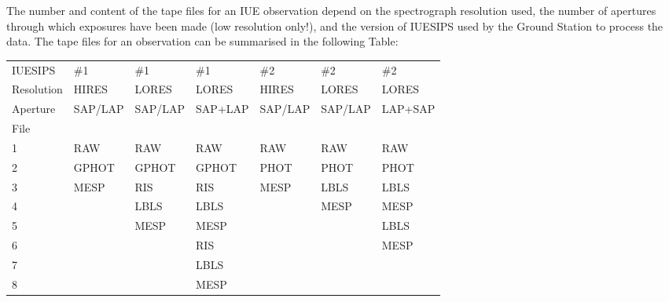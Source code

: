 The number and content of the tape files for an IUE observation depend on
the spectrograph resolution used, the number of apertures through which
exposures have been made (low resolution only!), and the version of IUESIPS
used by the Ground Station to process the data.  The tape files for an
observation can be summarised in the following Table:

\begin{latexonly}
\begin{tabular}{lllllll}
IUESIPS    & \#1     & \#1     & \#1     & \#2     & \#2     & \#2    \\
Resolution & HIRES   & LORES   & LORES   & HIRES   & LORES   & LORES  \\
Aperture   & SAP/LAP & SAP/LAP & SAP+LAP & SAP/LAP & SAP/LAP & LAP+SAP\\
File       &         &         &         &         &         &        \\
1          & RAW     & RAW     & RAW     & RAW     & RAW     & RAW    \\
2          & GPHOT   & GPHOT   & GPHOT   & PHOT    & PHOT    & PHOT   \\
3          & MESP    & RIS     & RIS     & MESP    & LBLS    & LBLS   \\
4          &         & LBLS    & LBLS    &         & MESP    & MESP   \\
5          &         & MESP    & MESP    &         &         & LBLS   \\
6          &         &         & RIS     &         &         & MESP   \\
7          &         &         & LBLS    &         &         &        \\
8          &         &         & MESP    &         &         &        \\
\end{tabular}
\end{latexonly}

\begin{htmlonly}
\end{htmlonly}

